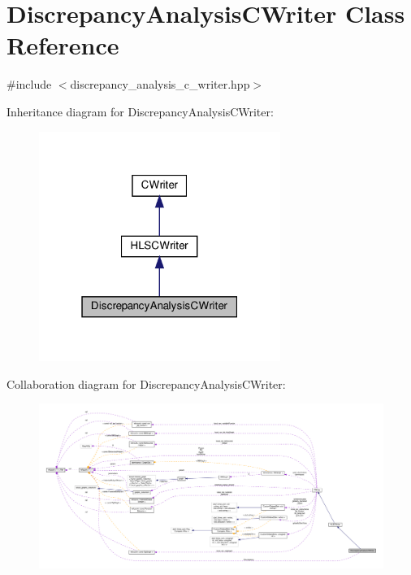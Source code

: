 \hypertarget{classDiscrepancyAnalysisCWriter}{}\section{Discrepancy\+Analysis\+C\+Writer Class Reference}
\label{classDiscrepancyAnalysisCWriter}


{\ttfamily \#include $<$discrepancy\+\_\+analysis\+\_\+c\+\_\+writer.\+hpp$>$}



Inheritance diagram for Discrepancy\+Analysis\+C\+Writer\+:
\nopagebreak
\begin{figure}[H]
\begin{center}
\leavevmode
\includegraphics[width=223pt]{df/dbc/classDiscrepancyAnalysisCWriter__inherit__graph}
\end{center}
\end{figure}


Collaboration diagram for Discrepancy\+Analysis\+C\+Writer\+:
\nopagebreak
\begin{figure}[H]
\begin{center}
\leavevmode
\includegraphics[width=350pt]{de/d76/classDiscrepancyAnalysisCWriter__coll__graph}
\end{center}
\end{figure}

